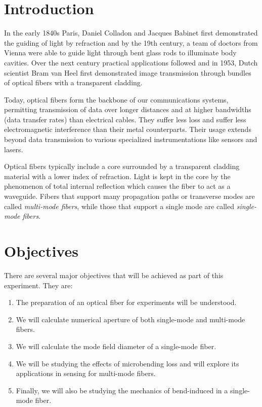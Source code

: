 \documentclass[%
 reprint,
 amsmath,amssymb,
 aps,
]{revtex4-2}
\begin{document}
\maketitle


\section{Introduction}


In the early 1840s Paris, Daniel Colladon and Jacques Babinet first demonstrated the guiding of light by refraction and by the 19th century, a team of doctors from Vienna were able to guide light through bent glass rods to illuminate body cavities. Over the next century practical applications followed and in 1953, Dutch scientist Bram van Heel first demonstrated image transmission through bundles of optical fibers with a transparent cladding. 

Today, optical fibers form the backbone of our communications systems, permitting transmission of data over longer distances and at higher bandwidths (data transfer rates) than electrical cables. They suffer less loss and suffer less electromagnetic interference than their metal counterparts. Their usage extends beyond data transmission to various specialized instrumentations like sensors and lasers.

Optical fibers typically include a core surrounded by a transparent cladding material with a lower index of refraction. Light is kept in the core by the phenomenon of total internal reflection which causes the fiber to act as a waveguide. Fibers that support many propagation paths or transverse modes are called \textit{multi-mode fibers}, while those that support a single mode are called \textit{single-mode fibers}.


\section{Objectives}
There are several major objectives that will be achieved as part of this experiment. They are:
\begin{enumerate}
	\item The preparation of an optical fiber for experiments will be understood.
	\item We will calculate numerical aperture of both single-mode and multi-mode fibers.
	\item We will calculate the mode field diameter of a single-mode fiber.
	\item We will be studying the effects of microbending loss and will explore its applications in sensing for multi-mode fibers.
	\item Finally, we will also be studying the mechanics of bend-induced in a single-mode fiber.
\end{enumerate}
\end{document}
